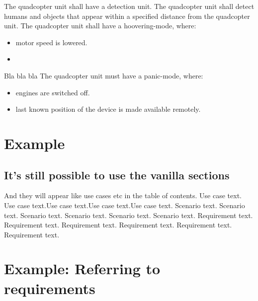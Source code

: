 \documentclass[a4paper]{article}
\begin{document}
 The quadcopter unit shall have a detection unit.
 The quadcopter unit shall detect humans and objects that appear within a specified distance from the quadcopter unit.
 The quadcopter unit shall have a hoovering-mode, where:
\begin{itemize}
\item motor speed is lowered.
\item
\end{itemize}
 Bla bla bla
 The quadcopter unit must have a panic-mode, where:
\begin{itemize}
\item engines are switched off.
\item last known position of the device is made available remotely.
\end{itemize}



\section{Example}
\subsection{It's still possible to use the vanilla sections}
And they will appear like use cases etc in the table of contents.
 Use case text. Use case text.Use case text.Use case text.Use case text.
 Scenario text. Scenario text. Scenario text. Scenario text. Scenario text. Scenario text.
 Requirement text. Requirement text. Requirement text. Requirement text. Requirement text. Requirement text.


\section{Example: Referring to requirements}
\end{document}
